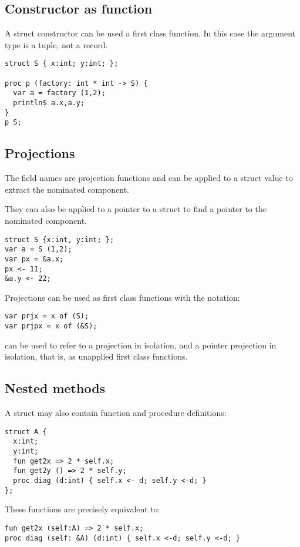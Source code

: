 \documentclass[oneside]{book}
\begin{document}
\subsection{Constructor as function}
A struct constructor can be used a first class function.
In this case the argument type is a tuple, not a record.

\begin{verbatim}
struct S { x:int; y:int; };

proc p (factory: int * int -> S) {
  var a = factory (1,2);
  println$ a.x,a.y;
}
p S;
\end{verbatim}

\subsection{Projections}
The field names are projection functions and can be applied
to a struct value to extract the nominated component.

They can also be applied to a pointer to a struct to find a pointer to the
nominated component.

\begin{verbatim}
struct S {x:int, y:int; };
var a = S (1,2);
var px = &a.x;
px <- 11;
&a.y <- 22;
\end{verbatim}

Projections can be used as first class functions with the notation:

\begin{verbatim}
var prjx = x of (S);
var prjpx = x of (&S);
\end{verbatim}

can be used to refer to a projection in isolation, and a pointer
projection in isolation, that is, as unapplied first class functions.

\subsection{Nested methods}
A struct may also contain function and procedure definitions:

\begin{verbatim}
struct A { 
  x:int;
  y:int;
  fun get2x => 2 * self.x;
  fun get2y () => 2 * self.y;
  proc diag (d:int) { self.x <- d; self.y <-d; }
};
\end{verbatim}

These functions are precisely equivalent to:

\begin{verbatim}
fun get2x (self:A) => 2 * self.x;
proc diag (self: &A) (d:int) { self.x <-d; self.y <-d; }
\end{verbatim}
\end{document}
